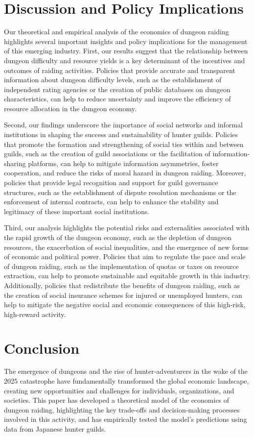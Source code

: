 \documentclass[12pt, a4paper]{article}
\begin{document}
\section{Discussion and Policy Implications}
Our theoretical and empirical analysis of the economics of dungeon raiding highlights several important insights and policy implications for the management of this emerging industry. First, our results suggest that the relationship between dungeon difficulty and resource yields is a key determinant of the incentives and outcomes of raiding activities. Policies that provide accurate and transparent information about dungeon difficulty levels, such as the establishment of independent rating agencies or the creation of public databases on dungeon characteristics, can help to reduce uncertainty and improve the efficiency of resource allocation in the dungeon economy.

Second, our findings underscore the importance of social networks and informal institutions in shaping the success and sustainability of hunter guilds. Policies that promote the formation and strengthening of social ties within and between guilds, such as the creation of guild associations or the facilitation of information-sharing platforms, can help to mitigate information asymmetries, foster cooperation, and reduce the risks of moral hazard in dungeon raiding. Moreover, policies that provide legal recognition and support for guild governance structures, such as the establishment of dispute resolution mechanisms or the enforcement of internal contracts, can help to enhance the stability and legitimacy of these important social institutions.

Third, our analysis highlights the potential risks and externalities associated with the rapid growth of the dungeon economy, such as the depletion of dungeon resources, the exacerbation of social inequalities, and the emergence of new forms of economic and political power. Policies that aim to regulate the pace and scale of dungeon raiding, such as the implementation of quotas or taxes on resource extraction, can help to promote sustainable and equitable growth in this industry. Additionally, policies that redistribute the benefits of dungeon raiding, such as the creation of social insurance schemes for injured or unemployed hunters, can help to mitigate the negative social and economic consequences of this high-risk, high-reward activity.

\section{Conclusion}
The emergence of dungeons and the rise of hunter-adventurers in the wake of the 2025 catastrophe have fundamentally transformed the global economic landscape, creating new opportunities and challenges for individuals, organizations, and societies. This paper has developed a theoretical model of the economics of dungeon raiding, highlighting the key trade-offs and decision-making processes involved in this activity, and has empirically tested the model's predictions using data from Japanese hunter guilds.
\end{document}
